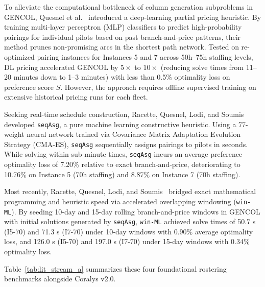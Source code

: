 \documentclass[journal]{IEEEtran}
\begin{document}
To alleviate the computational bottleneck of column generation subproblems in GENCOL, Quesnel et al.~\cite{quesnel2022} introduced a deep-learning partial pricing heuristic. By training multi-layer perceptron (MLP) classifiers to predict high-probability pairings for individual pilots based on past branch-and-price patterns, their method prunes non-promising arcs in the shortest path network. Tested on re-optimized pairing instances for Instances 5 and 7 across 50h--75h staffing levels, DL pricing accelerated GENCOL by $5\times$ to $10\times$ (reducing solve times from 11--20 minutes down to 1--3 minutes) with less than 0.5\% optimality loss on preference score $S$. However, the approach requires offline supervised training on extensive historical pricing runs for each fleet.

Seeking real-time schedule construction, Racette, Quesnel, Lodi, and Soumis~\cite{racette2024} developed \texttt{seqAsg}, a pure machine learning constructive heuristic. Using a 77-weight neural network trained via Covariance Matrix Adaptation Evolution Strategy (CMA-ES), \texttt{seqAsg} sequentially assigns pairings to pilots in seconds. While solving within sub-minute times, \texttt{seqAsg} incurs an average preference optimality loss of 7.20\% relative to exact branch-and-price, deteriorating to 10.76\% on Instance 5 (70h staffing) and 8.87\% on Instance 7 (70h staffing).

Most recently, Racette, Quesnel, Lodi, and Soumis~\cite{racette2025} bridged exact mathematical programming and heuristic speed via accelerated overlapping windowing (\texttt{win-ML}). By seeding 10-day and 15-day rolling branch-and-price windows in GENCOL with initial solutions generated by \texttt{seqAsg}, \texttt{win-ML} achieved solve times of 50.7 s (I5-70) and 71.3 s (I7-70) under 10-day windows with 0.90\% average optimality loss, and 126.0 s (I5-70) and 197.0 s (I7-70) under 15-day windows with 0.34\% optimality loss.

Table~\ref{tab:lit_stream_a} summarizes these four foundational rostering benchmarks alongside Coralys v2.0.
\end{document}
